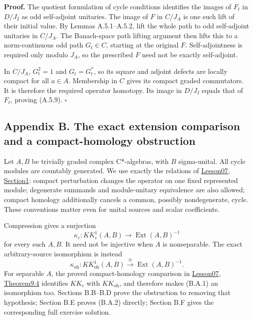 \documentclass[
  11pt,
]{article}
\begin{document}
\textbf{Proof.} The quotient formulation of cycle conditions identifies
the images of \(F_t\) in \(D/J_I\) as odd self-adjoint unitaries. The
image of \(F\) in \(C/J_A\) is one such lift of their initial value. By
Lemmas A.5.1--A.5.2, lift the whole path to odd self-adjoint unitaries
in \(C/J_A\). The Banach-space path lifting argument then lifts this to
a norm-continuous odd path \(G_t\in C\), starting at the original \(F\).
Self-adjointness is required only modulo \(J_A\), so the prescribed
\(F\) need not be exactly self-adjoint.

In \(C/J_A\), \(G_t^2=1\) and \(G_t=G_t^*\), so its square and adjoint
defects are locally compact for all \(a\in A\). Membership in \(C\)
gives its compact graded commutators. It is therefore the required
operator homotopy. Its image in \(D/J_I\) equals that of \(F_t\),
proving (A.5.9). \(\square\)

\subsection{Appendix B. The exact extension comparison and a
compact-homology
obstruction}\label{appendix-b.-the-exact-extension-comparison-and-a-compact-homology-obstruction}

Let \(A,B\) be trivially graded complex C*-algebras, with \(B\)
sigma-unital. All cycle modules are countably generated. We use exactly
the relations of
\href{KT-KK-07.html\#1-which-equivalence-relation}{Lesson07, Section1}:
compact perturbation changes the operator on one fixed represented
module; degenerate summands and module-unitary equivalence are also
allowed; compact homology additionally cancels a common, possibly
nondegenerate, cycle. These conventions matter even for unital sources
and scalar coefficients.

Compression gives a surjection \[
\kappa_c:KK_c^1(A,B)\longrightarrow\operatorname{Ext}(A,B)^{-1}
\tag{B.A.1}
\] for every such \(A,B\). It need not be injective when \(A\) is
nonseparable. The exact arbitrary-source isomorphism is instead \[
\kappa_{\mathrm{oh}}:KK_{\mathrm{oh}}^1(A,B)
\xrightarrow{\cong}\operatorname{Ext}(A,B)^{-1}.
\tag{B.A.2}
\] For separable \(A\), the proved compact-homology comparison in
\href{KT-KK-07.html\#9-cobordism-and-compact-homology}{Lesson07,
Theorem9.4} identifies \(KK_c\) with \(KK_{\mathrm{oh}}\), and therefore
makes (B.A.1) an isomorphism too. Sections B.B--B.D prove the
obstruction to removing that hypothesis; Section B.E proves (B.A.2)
directly; Section B.F gives the corresponding full exercise solution.
\end{document}
